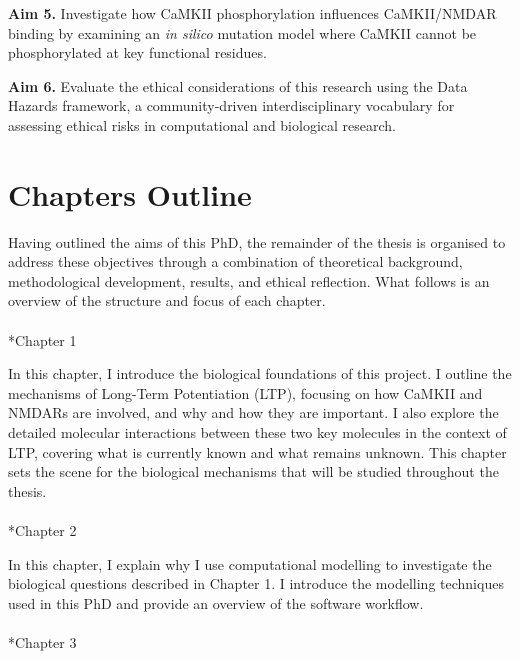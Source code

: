 \documentclass[
  11pt,
  letterpaper,
]{scrreprt}
\makeatletter
\let\oldparagraph\paragraph
\renewcommand{\paragraph}{
    \@ifstar
      \xxxParagraphStar
      \xxxParagraphNoStar
  }
\newcommand{\xxxParagraphStar}[1]{\oldparagraph*{#1}\mbox{}}
\newcommand{\xxxParagraphNoStar}[1]{\oldparagraph{#1}\mbox{}}
\makeatother
\begin{document}
\textbf{Aim 5.} Investigate how CaMKII phosphorylation influences
CaMKII/NMDAR binding by examining an \emph{in silico} mutation model
where CaMKII cannot be phosphorylated at key functional residues.

\textbf{Aim 6.} Evaluate the ethical considerations of this research
using the Data Hazards framework, a community-driven interdisciplinary
vocabulary for assessing ethical risks in computational and biological
research.

\section*{Chapters Outline}\label{chapters-outline}


Having outlined the aims of this PhD, the remainder of the thesis is
organised to address these objectives through a combination of
theoretical background, methodological development, results, and ethical
reflection. What follows is an overview of the structure and focus of
each chapter.

\paragraph*{Chapter 1}\label{chapter-1}

In this chapter, I introduce the biological foundations of this project.
I outline the mechanisms of Long-Term Potentiation (LTP), focusing on
how CaMKII and NMDARs are involved, and why and how they are important.
I also explore the detailed molecular interactions between these two key
molecules in the context of LTP, covering what is currently known and
what remains unknown. This chapter sets the scene for the biological
mechanisms that will be studied throughout the thesis.

\paragraph*{Chapter 2}\label{chapter-2}

In this chapter, I explain why I use computational modelling to
investigate the biological questions described in Chapter 1. I introduce
the modelling techniques used in this PhD and provide an overview of the
software workflow.

\paragraph*{Chapter 3}\label{chapter-3}
\end{document}
